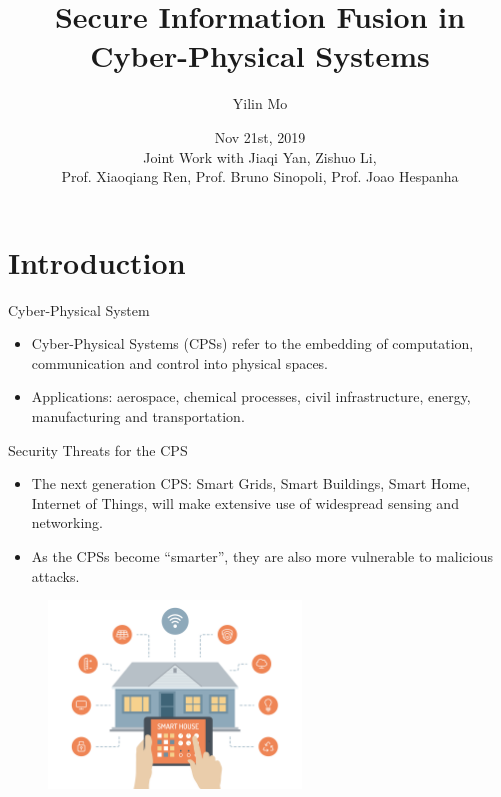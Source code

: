 \documentclass[10pt]{beamer}
\title[Secure Info Fusion]{Secure Information Fusion in Cyber-Physical Systems}
\author[Yilin Mo]{Yilin Mo}
\institute[Tsinghua]{
  Department of Automation\\ Tsinghua University\\
}
\date[Nov 21, 2019]{Nov 21st, 2019 \\ 
  \small Joint Work with Jiaqi Yan, Zishuo Li,\\
  Prof. Xiaoqiang Ren, Prof. Bruno Sinopoli, Prof. Joao Hespanha}
\begin{document}
\maketitle 

\section{Introduction}

\begin{frame}{Cyber-Physical System}
  \begin{itemize}
  \item Cyber-Physical Systems (CPSs) refer to the embedding of computation, communication and control into physical spaces.
    \begin{center}
    \end{center}
  \item Applications: aerospace, chemical processes, civil infrastructure, energy, manufacturing and transportation. 
  \end{itemize}
\end{frame}

\begin{frame}{Security Threats for the CPS}
  \begin{itemize}
  \item The next generation CPS: Smart Grids, Smart Buildings, Smart Home, Internet of Things, will make extensive use of widespread sensing and networking.
  \item As the CPSs become ``smarter'', they are also more vulnerable to malicious attacks.
  \end{itemize}
  \begin{figure}[ht]
    \centering
    \includegraphics[width=0.6\textwidth]{SmartHome.jpg}
  \end{figure}
\end{frame}
\end{document}
